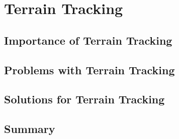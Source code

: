 \chapter{Terrain Tracking}
\label{chap:sixth}
\ifpdf
    \graphicspath{{Chapter6/Figures/PNG/}{Chapter6/Figures/PDF/}{Chapter6/Figures/}{Chapter6/Figures/EPS/}}
\else
    \graphicspath{{Chapter6/Figures/EPS/}{Chapter6/Figures/}}
\fi


\section{Importance of Terrain Tracking}

\section{Problems with Terrain Tracking}

\section{Solutions for Terrain Tracking}

\section{Summary}